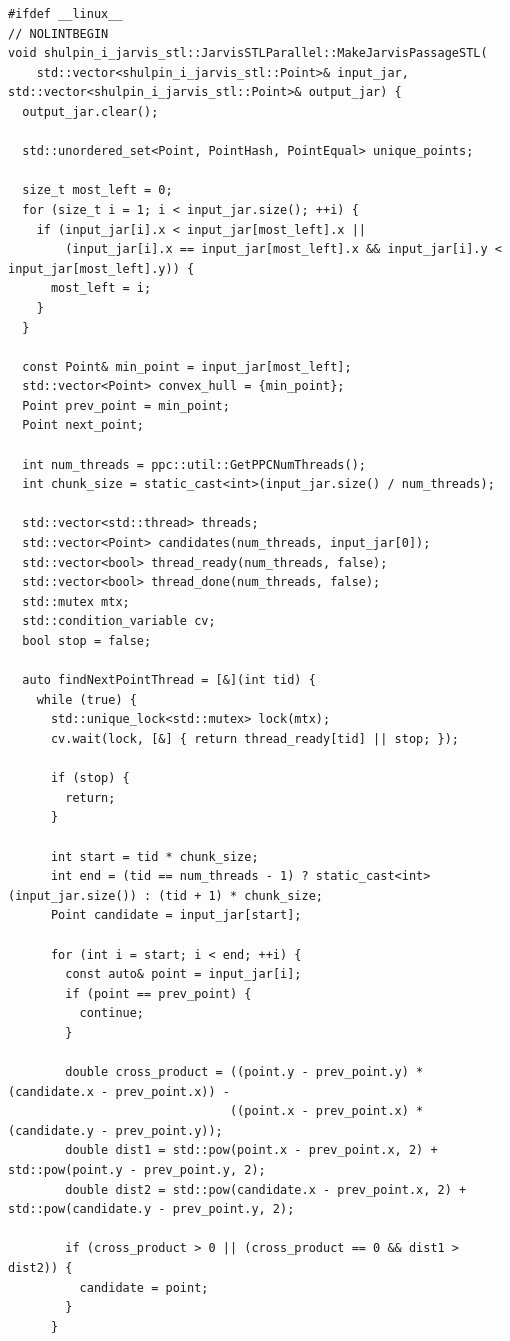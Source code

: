 \documentclass[12pt,a4paper]{article}
\begin{document}
\begin{lstlisting}[caption={STL-версия алгоритма}]
#ifdef __linux__
// NOLINTBEGIN
void shulpin_i_jarvis_stl::JarvisSTLParallel::MakeJarvisPassageSTL(
    std::vector<shulpin_i_jarvis_stl::Point>& input_jar, std::vector<shulpin_i_jarvis_stl::Point>& output_jar) {
  output_jar.clear();

  std::unordered_set<Point, PointHash, PointEqual> unique_points;

  size_t most_left = 0;
  for (size_t i = 1; i < input_jar.size(); ++i) {
    if (input_jar[i].x < input_jar[most_left].x ||
        (input_jar[i].x == input_jar[most_left].x && input_jar[i].y < input_jar[most_left].y)) {
      most_left = i;
    }
  }

  const Point& min_point = input_jar[most_left];
  std::vector<Point> convex_hull = {min_point};
  Point prev_point = min_point;
  Point next_point;

  int num_threads = ppc::util::GetPPCNumThreads();
  int chunk_size = static_cast<int>(input_jar.size() / num_threads);

  std::vector<std::thread> threads;
  std::vector<Point> candidates(num_threads, input_jar[0]);
  std::vector<bool> thread_ready(num_threads, false);
  std::vector<bool> thread_done(num_threads, false);
  std::mutex mtx;
  std::condition_variable cv;
  bool stop = false;

  auto findNextPointThread = [&](int tid) {
    while (true) {
      std::unique_lock<std::mutex> lock(mtx);
      cv.wait(lock, [&] { return thread_ready[tid] || stop; });

      if (stop) {
        return;
      }

      int start = tid * chunk_size;
      int end = (tid == num_threads - 1) ? static_cast<int>(input_jar.size()) : (tid + 1) * chunk_size;
      Point candidate = input_jar[start];

      for (int i = start; i < end; ++i) {
        const auto& point = input_jar[i];
        if (point == prev_point) {
          continue;
        }

        double cross_product = ((point.y - prev_point.y) * (candidate.x - prev_point.x)) -
                               ((point.x - prev_point.x) * (candidate.y - prev_point.y));
        double dist1 = std::pow(point.x - prev_point.x, 2) + std::pow(point.y - prev_point.y, 2);
        double dist2 = std::pow(candidate.x - prev_point.x, 2) + std::pow(candidate.y - prev_point.y, 2);

        if (cross_product > 0 || (cross_product == 0 && dist1 > dist2)) {
          candidate = point;
        }
      }


\end{lstlisting}
\end{document}
